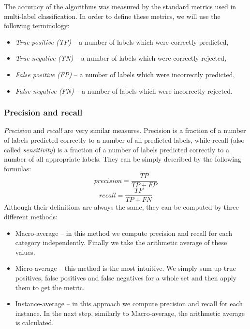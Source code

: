 \documentclass[english,a4paper,twoside]{ppfcmthesis}
\begin{document}
The accuracy of the algorithms was measured by the standard metrics used in multi-label classification. In order to define these metrics, we will use the following terminology:
\begin{itemize}
    \item \textit{True positive (TP)} -- a number of labels which were correctly predicted,
    \item \textit{True negative (TN)} -- a number of labels which were correctly rejected,
    \item \textit{False positive (FP)} -- a number of labels which were incorrectly predicted,
    \item \textit{False negative (FN)} -- a number of labels which were incorrectly rejected.
\end{itemize}

\subsubsection{Precision and recall} 

\textit{Precision} and \textit{recall} are very similar measures. Precision is a fraction of a number of labels predicted correctly to a number of all predicted labels, while recall (also called \textit{sensitivity}) is a fraction of a number of labels predicted correctly to a number of all appropriate labels. They can be simply described by the following formulas:  
\begin{equation}
\label{eq:exp2}
precision=\frac{TP}{TP+FP}
\end{equation}
\begin{equation}
\label{eq:exp3}
recall=\frac{TP}{TP+FN}
\end{equation}
Although their definitions are always the same, they can be computed by three different methods:
\begin{itemize}
\item Macro-average -- in this method we compute precision and recall for each category independently. Finally we take the arithmetic average of these values.
\item Micro-average -- this method is the most intuitive. We simply sum up true positives, false positives and false negatives for a whole set and then apply them to get the metric. 
\item Instance-average -- in this approach we compute precision and recall for each instance. In the next step, similarly to Macro-average, the arithmetic average is calculated.
\end{itemize}
\end{document}
